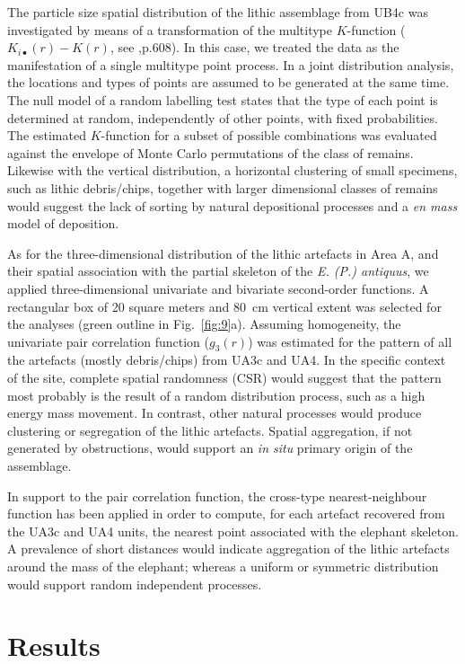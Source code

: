 \documentclass[review,authoryear,times]{elsarticle} %
\begin{document}
The particle size spatial distribution of the lithic assemblage from UB4c was investigated by means of a transformation of the multitype $K$-function ($K_{i\bullet}(r)-K(r)$, see \cite{spatstatBook},p.608). In this case, we treated the data as the manifestation of a single multitype point process. In a joint distribution analysis, the locations and types of points are assumed to be generated at the same time. The null model of a random labelling test states that the type of each point is determined at random, independently of other points, with fixed probabilities. The estimated $K$-function for a subset of possible combinations was evaluated against the envelope of Monte Carlo permutations of the class of remains. Likewise with the vertical distribution, a horizontal clustering of small specimens, such as lithic debris/chips, together with larger dimensional classes of remains would suggest the lack of sorting by natural depositional processes and a \emph{en mass} model of deposition.

As for the three-dimensional distribution of the lithic artefacts in Area A, and their spatial association with the partial skeleton of the \emph{E. (P.) antiquus}, we applied three-dimensional univariate and bivariate second-order functions. A rectangular box of 20 square meters and 80~cm vertical extent was selected for the analyses (green outline in Fig.~\ref{fig:9}a). Assuming homogeneity, the univariate pair correlation function ($g_3(r)$) was estimated for the pattern of all the artefacts (mostly debris/chips) from UA3c and UA4. In the specific context of the site, complete spatial randomness (CSR) would suggest that the pattern most probably is the result of a random distribution process, such as a high energy mass movement. In contrast, other natural processes would produce clustering or segregation of the lithic artefacts. Spatial aggregation, if not generated by obstructions, would support an \emph{in situ} primary origin of the assemblage.

In support to the pair correlation function, the cross-type nearest-neighbour function has been applied in order to compute, for each artefact recovered from the UA3c and UA4 units, the nearest point associated with the elephant skeleton. A prevalence of short distances would indicate aggregation of the lithic artefacts around the mass of the elephant; whereas a uniform or symmetric distribution would support random independent processes.

\section{Results}
\end{document}
